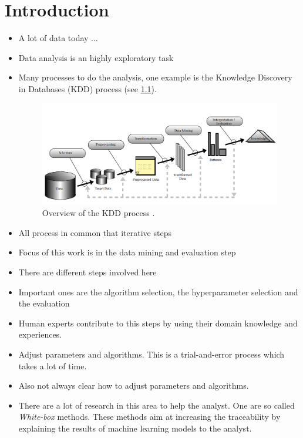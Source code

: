 \chapter{Introduction}
\label{chap:intro}
\begin{itemize}
    \item A lot of data today ...
    \item Data analysis is an highly exploratory task
    \item Many processes to do the analysis, one example is the Knowledge Discovery in Databases (KDD) process (see \cref{fig:kdd}).
    \begin{figure}
        \centering
        \includegraphics[width=\textwidth]{graphics/kdd_process.png}
        \caption{Overview of the KDD process \cite{Fayyad:1996:DMK:257938.257942}.}
        \label{fig:kdd}
    \end{figure}
    \item All process in common that iterative steps
    \item Focus of this work is in the data mining and evaluation step
    \item There are different steps involved here
    \item Important ones are the algorithm selection, the hyperparameter selection and the evaluation
    \item Human experts contribute to this steps by using their domain knowledge and experiences.
    \item Adjust parameters and algorithms. This is a trial-and-error process which takes a lot of time.
    \item  Also not always clear how to adjust parameters and algorithms.
    \item There are a lot of research in this area to help the analyst.
    One are so called \textit{White-box} methods.
    These methods aim at increasing the traceability by explaining the results of machine learning models to the analyst.

\end{itemize}
